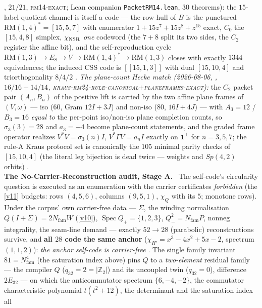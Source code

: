 \documentclass[11pt,a4paper]{article}
\newcommand{\Nfam}{N_{\mathrm{fam}}}
\newcommand{\Z}{\mathbb{Z}}
\theoremstyle{definition}
\begin{document}
\begin{winbox}
{, $21/21$, \textsc{rm14-exact};
Lean companion \texttt{PacketRM14.lean}, $30$ theorems):} the
$15$-label quotient channel is itself a code --- the row hull of
$B$ is the punctured $\mathrm{RM}(1,4)^*=[15,5,7]$ with enumerator
$1+15z^7+15z^8+z^{15}$ exact, $C_0$ the $[15,4,8]$ simplex,
$\chi_{\rm NSR}$ \emph{one} codeword (the $7{+}8$ split its two
sides, the $C_2$ register the affine bit), and the
self-reproduction cycle $\mathrm{RM}(1,3)\to E_8\to V\to
\mathrm{RM}(1,4)^*\to\mathrm{RM}(1,3)$ closes with exactly $1344$
equivalences; the induced CSS code is $[[15,1,3]]$ with dual
$[15,10,4]$ and triorthogonality $8/4/2$ \mE.
\emph{The plane-count Hecke match (2026-08-06,
, $16/16+14/14$,
\textsc{kraus-rm24-rule-canonical}$+$\textsc{planeframes-exact}):}
the $C_2$ packet pair $(A_n,B_n)$ of the positive lift is carried
by the two affine plane frames of $(V,\omega)$ --- iso ($60$, Gram
$12I{+}3J$) and non-iso ($80$, $16I{+}4J$) --- with $A_3=12$ /
$B_3=16$ \emph{equal to} the per-point iso/non-iso plane
completion counts, so $\sigma_3(3)=28$ and $a_3=-4$ become
plane-count statements, and the graded frame operator realizes
$V^*V=\sigma_3(n)I$, $V^*\Gamma V=a_nI$ exactly on $\mathbf1^\perp$
for $n=3,5,7$; the rule-A Kraus protocol set is canonically the
$105$ minimal parity checks of $[15,10,4]$ (the literal leg
bijection is dead twice --- weights and $Sp(4,2)$ orbits) \mE.
\smallskip\\
\noindent\textbf{The No-Carrier-Reconstruction audit, Stage A.}
\ The self-code's circularity question is
executed as an enumeration with the carrier certificates \emph{forbidden} (the \vref{v11} budgets:
rows $(4,5,6)$, columns $(9,5,1)$, $\chi_Q$ with its $5$; monotone rows).  Under the corpus' own
carrier-free data --- $\Sigma$, the winding normalisation $Q(I{+}\Sigma)=2\Nfam W$ (\vref{v10}),
$\operatorname{Spec}Q_+=\{1,2,3\}$, $Q_-^2=\Nfam P$, nonneg integrality, the seam-line demand ---
exactly $52\to28$ (parabolic) reconstructions survive, and \textbf{all $28$ code the same anchor}
($\chi_{H'}=x^3-4x^2+5x-2$, spectrum $(1,1,2)$): \emph{the anchor self-code is carrier-free} \mE.
The single family invariant $81=\Nfam^4$ (the saturation index above) pins $Q$ to a
\emph{two-element} residual family --- the compiler $Q$ ($q_{32}=2=|\Z_2|$) and its uncoupled twin
($q_{32}=0$), difference $2E_{32}$ --- on which the anticommutator spectrum $\{6,-4,-2\}$, the
commutator characteristic polynomial $t(t^2{+}12)$, the determinant and the saturation index all

\end{winbox}
\end{document}
